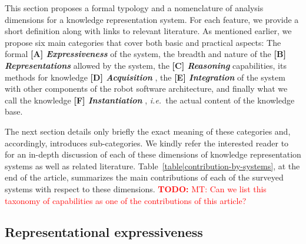 \documentclass[journal]{IEEEtran}
\newcommand{\ie}{{\textit{i.e.\ }}}
\newcommand{\taxon}[2]{%
    \textbf{[#1] \emph{#2}}
}
\newcommand{\todo}[1]{\textcolor{red}{\textbf{TODO:} #1}}
\begin{document}
% 
This section proposes a formal typology and a nomenclature of analysis 
dimensions for a knowledge representation system. For each feature, we provide 
a short definition along with links to relevant literature. As mentioned 
earlier, we propose six main categories that cover both basic and practical 
aspects: The formal \taxon{A}{Expressiveness} of the system, the breadth and 
nature of the \taxon{B}{Representations} allowed by the system, the
\taxon{C}{Reasoning} capabilities, its methods for knowledge 
\taxon{D}{Acquisition}, the \taxon{E}{Integration} of the system with other 
components of the robot software architecture, and finally what we call
the knowledge \taxon{F}{Instantiation}, \ie the actual content of the knowledge
base.

The next section details only briefly the exact meaning of these categories
and, accordingly, introduces sub-categories. We kindly refer the interested 
reader to~\cite{lemaignan2012symbolic} for an in-depth discussion of each of 
these dimensions of knowledge representation systems as well as related 
literature.
% 
Table~\ref{table|contribution-by-systems}, at the end of the article, summarizes
the main contributions of each of the surveyed systems with respect to these
dimensions. \todo{MT: Can we list this taxonomy of capabilities as one of the 
contributions of this article?}


\subsection{Representational expressiveness}
\label{sect|expressiveness}
\end{document}
